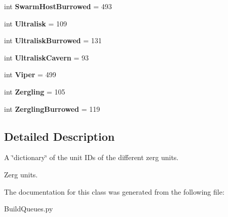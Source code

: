 \begin{DoxyCompactItemize}
\item 
int {\bfseries Swarm\+Host\+Burrowed} = 493\hypertarget{classBuildQueues_1_1Zerg_ae02e03ef4c96fd0b01b149c48befde63}{}\label{classBuildQueues_1_1Zerg_ae02e03ef4c96fd0b01b149c48befde63}

\item 
int {\bfseries Ultralisk} = 109\hypertarget{classBuildQueues_1_1Zerg_a398bfeb70452e03d85615f33d6e61809}{}\label{classBuildQueues_1_1Zerg_a398bfeb70452e03d85615f33d6e61809}

\item 
int {\bfseries Ultralisk\+Burrowed} = 131\hypertarget{classBuildQueues_1_1Zerg_ad8d935184dfef47aa587795bfdcf5824}{}\label{classBuildQueues_1_1Zerg_ad8d935184dfef47aa587795bfdcf5824}

\item 
int {\bfseries Ultralisk\+Cavern} = 93\hypertarget{classBuildQueues_1_1Zerg_a28bcd588b8754b4a04bd504b38e055ad}{}\label{classBuildQueues_1_1Zerg_a28bcd588b8754b4a04bd504b38e055ad}

\item 
int {\bfseries Viper} = 499\hypertarget{classBuildQueues_1_1Zerg_aa3b9419d74a1a0a31cecf35b58b5ed98}{}\label{classBuildQueues_1_1Zerg_aa3b9419d74a1a0a31cecf35b58b5ed98}

\item 
int {\bfseries Zergling} = 105\hypertarget{classBuildQueues_1_1Zerg_a12ae725fdc4a6b1a66a01de073ef6206}{}\label{classBuildQueues_1_1Zerg_a12ae725fdc4a6b1a66a01de073ef6206}

\item 
int {\bfseries Zergling\+Burrowed} = 119\hypertarget{classBuildQueues_1_1Zerg_a19bfb1f5a25d6492cc95118134cd904d}{}\label{classBuildQueues_1_1Zerg_a19bfb1f5a25d6492cc95118134cd904d}

\end{DoxyCompactItemize}


\subsection{Detailed Description}
A \char`\"{}dictionary\char`\"{} of the unit ID\textquotesingle{}s of the different zerg units. 

\begin{DoxyVerb}Zerg units.\end{DoxyVerb}
 

The documentation for this class was generated from the following file\+:\begin{DoxyCompactItemize}
\item 
Build\+Queues.\+py\end{DoxyCompactItemize}
